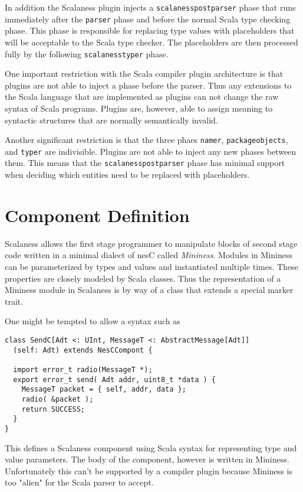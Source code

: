 In addition the Scalaness plugin injects a \texttt{scalanesspostparser} phase that runs
immediately after the \texttt{parser} phase and before the normal Scala type checking phase.
This phase is responsible for replacing type values with placeholders that will be acceptable to
the Scala type checker. The placeholders are then processed fully by the following
\texttt{scalanesstyper} phase.

One important restriction with the Scala compiler plugin architecture is that plugins are not
able to inject a phase before the parser. Thus any extensions to the Scala language that are
implemented as plugins can not change the raw syntax of Scala programs. Plugins are, however,
able to assign meaning to syntactic structures that are normally semantically invalid.

Another significant restriction is that the three phaes \texttt{namer}, \texttt{packageobjects},
and \texttt{typer} are indivisible. Plugins are not able to inject any new phases between them.
This means that the \texttt{scalanesspostparser} phase has minimal support when deciding which
entities need to be replaced with placeholders.


\section{Component Definition}

Scalaness allows the first stage programmer to manipulate blocks of second stage code written in
a minimal dialect of nesC called \textit{Mininess}. Modules in Mininess can be parameterized by
types and values and instantiated multiple times. These properties are closely modeled by Scala
classes. Thus the representation of a Mininess module in Scalaness is by way of a class that
extends a special marker trait.

One might be tempted to allow a syntax such as

\singlespace
\begin{lstlisting}
class SendC[Adt <: UInt, MessageT <: AbstractMessage[Adt]]
  (self: Adt) extends NesCCompont {

  import error_t radio(MessageT *);
  export error_t send( Adt addr, uint8_t *data ) {
    MessageT packet = { self, addr, data };
    radio( &packet );
    return SUCCESS;
  }
}
\end{lstlisting}
\primaryspacing

This defines a Scalaness component using Scala syntax for representing type and value
parameters. The body of the component, however is written in Mininess. Unfortunately this can't
be supported by a compiler plugin because Mininess is too "alien" for the Scala parser to
accept.

